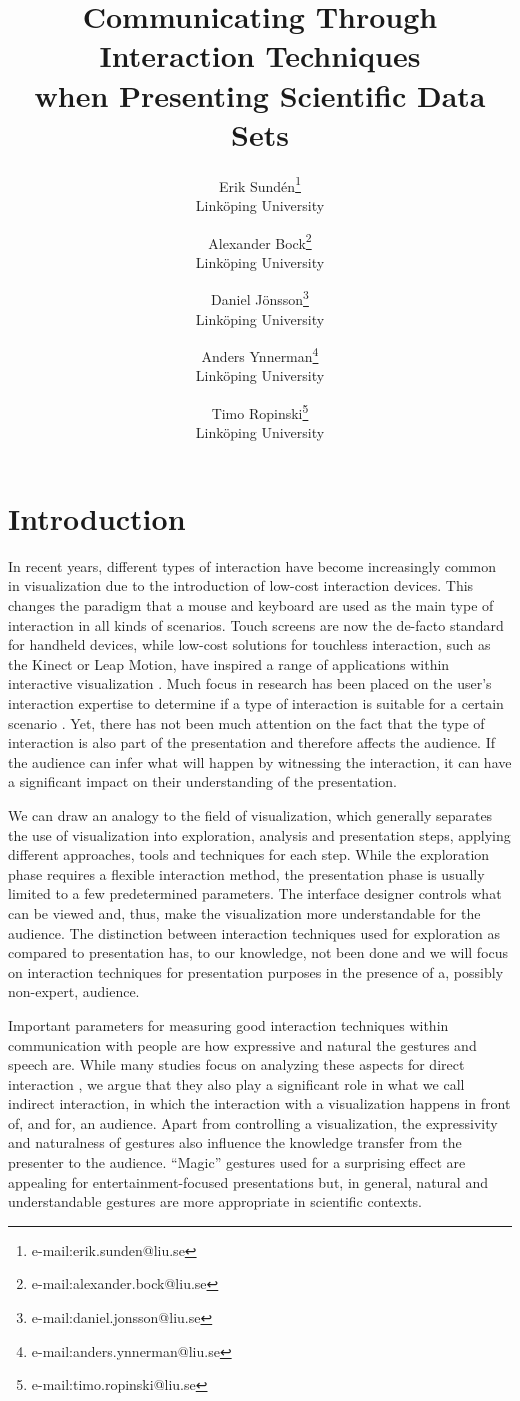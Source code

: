 \documentclass[review,journal]{vgtc}         %
\title{Communicating Through Interaction Techniques\\when Presenting Scientific Data Sets} %
\author{Erik Sund\'en\thanks{e-mail:erik.sunden@liu.se}\\ %
        \scriptsize Link{\"o}ping University %
\and Alexander Bock\thanks{e-mail:alexander.bock@liu.se}\\ %
			   \scriptsize Link{\"o}ping University %
\and Daniel J\"onsson\thanks{e-mail:daniel.jonsson@liu.se}\\ %
          \scriptsize Link{\"o}ping University %
\and Anders Ynnerman\thanks{e-mail:anders.ynnerman@liu.se}\\ %
          \scriptsize Link{\"o}ping University %
\and Timo Ropinski\thanks{e-mail:timo.ropinski@liu.se}\\ %
           \scriptsize Link{\"o}ping University }
\begin{document}
\maketitle

\section{Introduction}\label{sec:introduction}
In recent years, different types of interaction have become increasingly common in visualization due to the introduction of low-cost interaction devices.
This changes the paradigm that a mouse and keyboard are used as the main type of interaction in all kinds of scenarios.
Touch screens are now the de-facto standard for handheld devices, while low-cost solutions for touchless interaction, such as the Kinect or Leap Motion, have inspired a range of applications within interactive visualization \cite{zora82163, Jalaliniya:2013:TIM:2494091.2497332, OHaraGSPVMCCRDC14, 0724-4983}.
Much focus in research has been placed on the user's interaction expertise to determine if a type of interaction is suitable for a certain scenario \cite{DBLP:journals/tvcg/YiKSJ07}.
Yet, there has not been much attention on the fact that the type of interaction is also part of the presentation and therefore affects the audience.
If the audience can infer what will happen by witnessing the interaction, it can have a significant impact on their understanding of the presentation.

We can draw an analogy to the field of visualization, which generally separates the use of visualization into exploration, analysis and presentation steps, applying different approaches, tools and techniques for each step.
While the exploration phase requires a flexible interaction method, the presentation phase is usually limited to a few predetermined parameters.
The interface designer controls what can be viewed and, thus, make the visualization more understandable for the audience.
The distinction between interaction techniques used for exploration as compared to presentation has, to our knowledge, not been done and we will focus on interaction techniques for presentation purposes in the presence of a, possibly non-expert, audience.

Important parameters for measuring good interaction techniques within communication with people are how expressive \cite{Brewster:2009:MIE:2227763.2227769} and natural the gestures and speech are.
While many studies focus on analyzing these aspects for direct interaction \cite{978-3-642-12552-2, Caridakis:2013:NIE:2504335.2504378}, we argue that they also play a significant role in what we call indirect interaction, in which the interaction with a visualization happens in front of, and for, an audience.
Apart from controlling a visualization, the expressivity and naturalness of gestures also influence the knowledge transfer from the presenter to the audience.
``Magic'' gestures used for a surprising effect are appealing for entertainment-focused presentations but, in general, natural and understandable gestures are more appropriate in scientific contexts.
\end{document}
